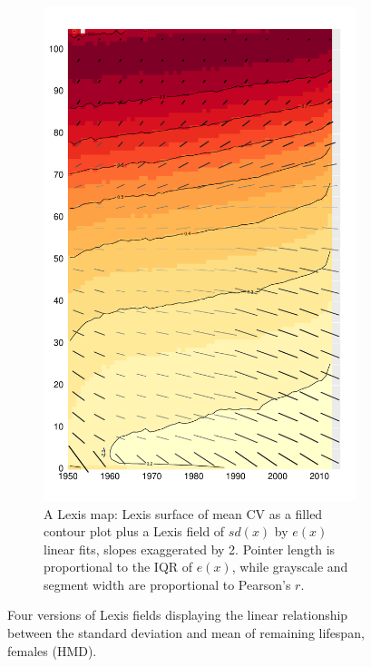 \documentclass{article}
\begin{document}
\begin{figure}
\begin{subfigure}{.48\textwidth}
  \includegraphics[scale=.38]{Figures/FigApp4.pdf}
  \caption{A Lexis map: Lexis surface of mean CV as a filled contour plot plus a Lexis field of $sd(x)$ by $e(x)$ linear fits, slopes exaggerated by 2. Pointer length is proportional to the IQR of $e(x)$, while grayscale and segment width are proportional to Pearson's $r$.}
  \label{fig:sfig4}
\end{subfigure}
\caption{Four versions of Lexis fields displaying the linear
relationship between the standard deviation and mean of remaining
lifespan, females (HMD).}
\label{fig:figFields}
\end{figure}
\end{document}
